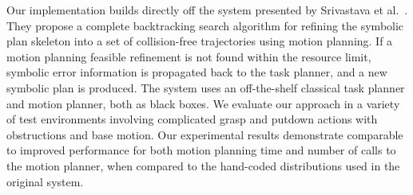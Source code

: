 Our implementation builds directly off the system presented by Srivastava et al.~\cite{srivastava2014combined}.
They propose a complete backtracking search algorithm for refining
the symbolic plan skeleton into a set of collision-free trajectories using motion planning.
If a motion planning feasible refinement is not found within the resource limit,
symbolic error information is propagated back to the task planner, and a new symbolic plan is produced.
The system uses an off-the-shelf classical task planner and motion planner, both as black boxes.
We evaluate our approach in a variety of test environments involving complicated grasp and putdown
actions with obstructions and base motion. Our experimental results demonstrate
comparable to improved performance for both motion planning time and number of calls to
the motion planner, when compared to the hand-coded distributions used in the original system.